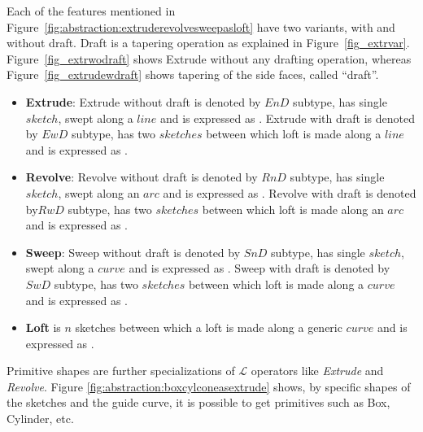 
Each of the features mentioned in Figure~\ref{fig:abstraction:extruderevolvesweepasloft} have two variants, with and without draft. Draft is a tapering operation as explained in Figure~\ref{fig_extrvar}. Figure~\ref{fig_extrwodraft} shows Extrude without any drafting operation, whereas Figure~\ref{fig_extrudewdraft} shows tapering of the side faces, called ``draft''.

\begin{itemize}[noitemsep,topsep=2pt,parsep=2pt,partopsep=2pt]
\item {\bf Extrude}: Extrude without draft is denoted by $EnD$ subtype, has single $sketch$, swept along a $line$ and is expressed as	
.
Extrude with draft is denoted by $EwD$ subtype, has two $sketches$ between which loft is made along a $line$ and is expressed as 
.
\item {\bf Revolve}: Revolve without draft is denoted by $RnD$ subtype, has single $sketch$, swept along an $arc$ and is expressed as
.		
Revolve with draft is denoted by$ RwD$ subtype, has two $sketches$ between which loft is made along an $arc$ and is expressed as
.	
\item {\bf Sweep}: Sweep without draft is denoted by $SnD$ subtype, has single $sketch$, swept along a $curve$ and is expressed as	
.		
Sweep with draft is denoted by $SwD$ subtype, has two $sketches$ between which loft is made along a $curve$ and is expressed as
.	
\item {\bf Loft} is $n$ sketches between which a loft is made along a generic $curve$ and is expressed as 
. 
\end{itemize}

Primitive shapes are further specializations of {\bf $\mathcal{L}$} operators like {\em Extrude} and {\em Revolve}.  Figure \ref{fig:abstraction:boxcylconeasextrude} shows, by specific shapes of the sketches and the guide curve, it is possible to get primitives such as Box, Cylinder, etc.


